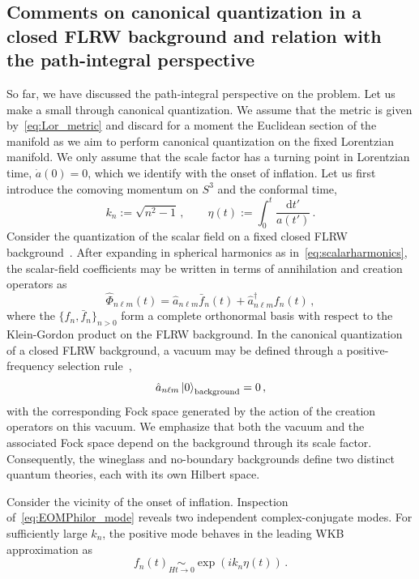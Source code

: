 \documentclass[a4paper,11pt]{article}
\begin{document}
\subsection{Comments on canonical quantization in a closed FLRW background and relation with the path-integral perspective}
So far, we have discussed the path-integral perspective on the problem. Let us make a small through canonical quantization. We assume that the metric is given by~\eqref{eq:Lor_metric} and discard for a moment the Euclidean section of the manifold as we aim to perform canonical quantization on the fixed Lorentzian manifold. We only assume that the scale factor has a turning point in Lorentzian time, $\dot{a}(0)=0$, which we identify with the onset of inflation. Let us first introduce the comoving momentum on $S^3$ and the conformal time,
\begin{equation}
k_n:=\sqrt{n^2-1}\,,
\qquad
\eta(t) := \int_{0}^{t}\frac{\mathrm{d}t'}{a(t')}\,.
\end{equation}
Consider the quantization of the scalar field on a fixed closed FLRW background~\cite{PhysRevD.31.754,AIHPA_1968__9_2_109_0,Birrell:1982ix}. After expanding in spherical harmonics as in~\eqref{eq:scalarharmonics}, the scalar-field coefficients may be written in terms of annihilation and creation operators as
\begin{equation}
\hat{\Phi}_{n\ell m}(t)
=
\hat{a}_{n\ell m} \bar{f}_{n}(t)
+
\hat{a}^{\dagger}_{n\ell m} f_{n}(t)\,,
\end{equation}
where the $\{f_n,\bar{f}_n\}_{n>0}$ form a complete orthonormal basis with respect to the Klein-Gordon product on the FLRW background.
In the canonical quantization of a closed FLRW background, a vacuum may be defined through a positive-frequency selection rule~\cite{Birrell:1982ix,PhysRevD.31.754,AIHPA_1968__9_2_109_0},
\begin{equation}\label{eq:vacuum_canonical}
\hat{a}_{n\ell m}\ket{0}_{\rm background} = 0\,,
\end{equation}
with the corresponding Fock space generated by the action of the creation operators on this vacuum. We emphasize that both the vacuum and the associated Fock space depend on the background through its scale factor. Consequently, the wineglass and no-boundary backgrounds define two distinct quantum theories, each with its own Hilbert space.

Consider the vicinity of the onset of inflation. Inspection of~\eqref{eq:EOMPhilor_mode} reveals two independent complex-conjugate modes. For sufficiently large $k_n$, the positive mode behaves in the leading WKB approximation as
\begin{equation}
f_{n}(t) \underset{Ht \to 0}{\sim}
\exp\left( i k_n \eta(t)\right)\,.
\end{equation}
\end{document}
